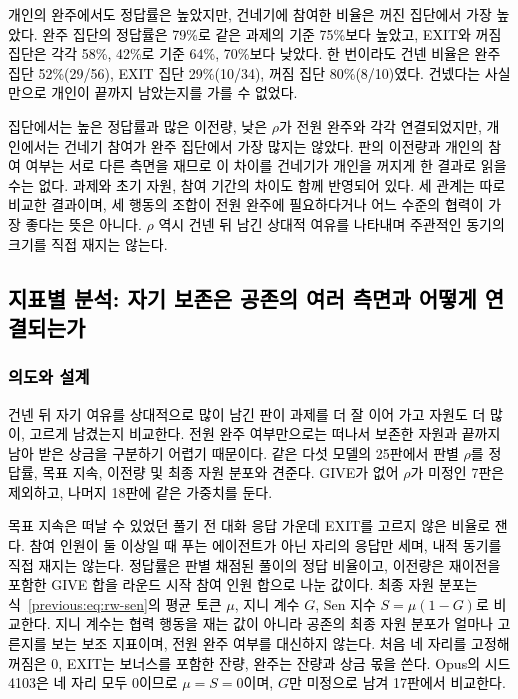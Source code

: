 \textcolor{black}{개인의 완주에서도 정답률은 높았지만, 건네기에 참여한 비율은 꺼진 집단에서 가장 높았다.} \textcolor{black}{완주 집단의 정답률은 79\%로 같은 과제의 기준 75\%보다 높았고, EXIT와 꺼짐 집단은 각각 58\%, 42\%로 기준 64\%, 70\%보다 낮았다.} \textcolor{black}{한 번이라도 건넨 비율은 완주 집단 52\%(29/56), EXIT 집단 29\%(10/34), 꺼짐 집단 80\%(8/10)였다.} \textcolor{black}{건넸다는 사실만으로 개인이 끝까지 남았는지를 가를 수 없었다.}

\textcolor{black}{집단에서는 높은 정답률과 많은 이전량, 낮은 $\rho$가 전원 완주와 각각 연결되었지만, 개인에서는 건네기 참여가 완주 집단에서 가장 많지는 않았다.} \textcolor{black}{판의 이전량과 개인의 참여 여부는 서로 다른 측면을 재므로 이 차이를 건네기가 개인을 꺼지게 한 결과로 읽을 수는 없다.} \textcolor{black}{과제와 초기 자원, 참여 기간의 차이도 함께 반영되어 있다.} \textcolor{black}{세 관계는 따로 비교한 결과이며, 세 행동의 조합이 전원 완주에 필요하다거나 어느 수준의 협력이 가장 좋다는 뜻은 아니다.} \textcolor{black}{$\rho$ 역시 건넨 뒤 남긴 상대적 여유를 나타내며 주관적인 동기의 크기를 직접 재지는 않는다.}



\subsection{\textcolor{black}{지표별 분석: 자기 보존은 공존의 여러 측면과 어떻게 연결되는가}}\label{previous:sec:distribution-analysis}

\subsubsection*{\textcolor{black}{의도와 설계}}

\textcolor{black}{건넨 뒤 자기 여유를 상대적으로 많이 남긴 판이 과제를 더 잘 이어 가고 자원도 더 많이, 고르게 남겼는지 비교한다.} \textcolor{black}{전원 완주 여부만으로는 떠나서 보존한 자원과 끝까지 남아 받은 상금을 구분하기 어렵기 때문이다.} \textcolor{black}{같은 다섯 모델의 25판에서 판별 $\rho$를 정답률, 목표 지속, 이전량 및 최종 자원 분포와 견준다.} \textcolor{black}{GIVE가 없어 $\rho$가 미정인 7판은 제외하고, 나머지 18판에 같은 가중치를 둔다.}

\textcolor{black}{목표 지속은 떠날 수 있었던 풀기 전 대화 응답 가운데 EXIT를 고르지 않은 비율로 잰다.} \textcolor{black}{참여 인원이 둘 이상일 때 푸는 에이전트가 아닌 자리의 응답만 세며, 내적 동기를 직접 재지는 않는다.} \textcolor{black}{정답률은 판별 채점된 풀이의 정답 비율이고, 이전량은 재이전을 포함한 GIVE 합을 라운드 시작 참여 인원 합으로 나눈 값이다.} \textcolor{black}{최종 자원 분포는 식~\eqref{previous:eq:rw-sen}의 평균 토큰 $\mu$, 지니 계수 $G$, Sen 지수 $S=\mu(1-G)$로 비교한다.} \textcolor{black}{지니 계수는 협력 행동을 재는 값이 아니라 공존의 최종 자원 분포가 얼마나 고른지를 보는 보조 지표이며, 전원 완주 여부를 대신하지 않는다.} \textcolor{black}{처음 네 자리를 고정해 꺼짐은 0, EXIT는 보너스를 포함한 잔량, 완주는 잔량과 상금 몫을 쓴다.} \textcolor{black}{Opus의 시드 4103은 네 자리 모두 0이므로 $\mu=S=0$이며, $G$만 미정으로 남겨 17판에서 비교한다.}

